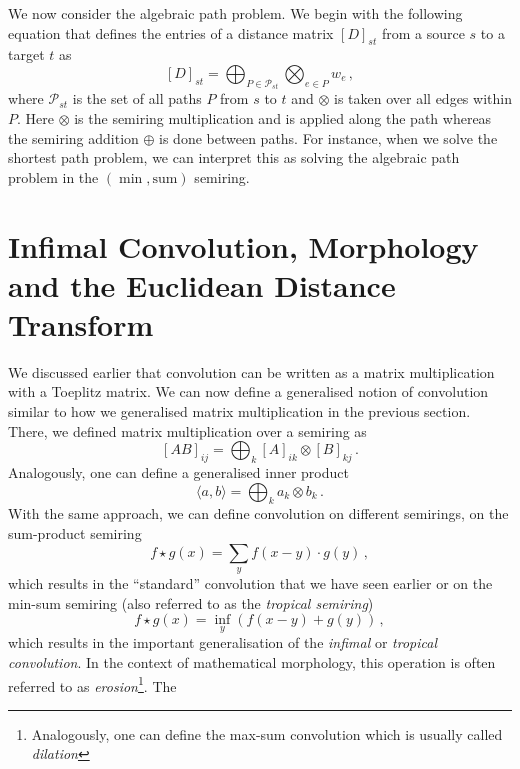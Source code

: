 We now consider the algebraic path problem. We begin with the following equation
that defines the entries of a distance matrix ${[D]}_{st}$ from a source $s$ to
a target $t$ as
\begin{equation*}
  {[D]}_{st} = \bigoplus_{P \in \mathcal{P}_{st}} \bigotimes_{e \in P} w_e\,,
\end{equation*}
where $\mathcal{P}_{st}$ is the set of all paths $P$ from $s$ to $t$ and
$\otimes$ is taken over all edges within $P$. Here $\otimes$ is the semiring
multiplication and is applied along the path whereas the semiring addition
$\oplus$ is done between paths. For instance, when we solve the shortest path
problem, we can interpret this as solving the algebraic path problem in the
$(\min, \text{sum})$ semiring.

\section{Infimal Convolution, Morphology and the Euclidean Distance Transform}
We discussed earlier that convolution can be written as a matrix multiplication
with a Toeplitz matrix. We can now define a generalised notion of convolution
similar to how we generalised matrix multiplication in the previous
section. There, we defined matrix multiplication over a semiring as
\begin{equation*}
  {[AB]}_{ij} = \bigoplus_k {[A]}_{ik} \otimes {[B]}_{kj}\,.
\end{equation*}
Analogously, one can define a generalised inner product
\begin{equation*}
  \langle a,b \rangle = \bigoplus_k a_k \otimes b_k\,.
\end{equation*}
With the same approach, we can define convolution on different semirings, \eg on
the sum-product semiring
\begin{equation*}
  f \star g(x) = \sum_y f(x-y) \cdot g(y)\,,
\end{equation*}
which results in the ``standard'' convolution that we have seen earlier or on
the min-sum semiring (also referred to as the \emph{tropical semiring})
\begin{equation*}
  f \star g(x) = \inf_y\left( f(x-y) + g(y)\right)\,,
\end{equation*}
which results in the important generalisation of the \emph{infimal} or
\emph{tropical convolution}. In the context of mathematical morphology, this
operation is often referred to as \emph{erosion}\footnote{Analogously, one can
  define the max-sum convolution which is usually called \emph{dilation}}. The
